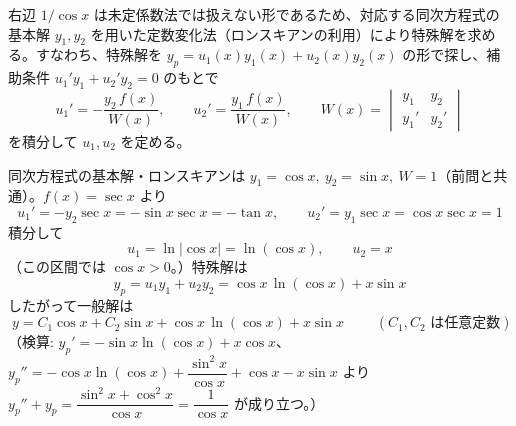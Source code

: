 
右辺 $1/\cos x$ は未定係数法では扱えない形であるため、対応する同次方程式の基本解 $y_{1}, y_{2}$ を用いた定数変化法（ロンスキアンの利用）により特殊解を求める。すなわち、特殊解を $y_{p} = u_{1}(x)y_{1}(x) + u_{2}(x)y_{2}(x)$ の形で探し、補助条件 $u_{1}'y_{1} + u_{2}'y_{2} = 0$ のもとで
\[
u_{1}' = -\frac{y_{2}\,f(x)}{W(x)}, \qquad u_{2}' = \frac{y_{1}\,f(x)}{W(x)}, \qquad W(x) = \begin{vmatrix} y_{1} & y_{2} \\ y_{1}' & y_{2}' \end{vmatrix}
\]
を積分して $u_{1}, u_{2}$ を定める。

同次方程式の基本解・ロンスキアンは $y_{1}=\cos x,\ y_{2}=\sin x,\ W=1$（前問と共通）。$f(x)=\sec x$ より
\[
u_{1}' = -y_{2}\sec x = -\sin x\sec x = -\tan x,
\qquad
u_{2}' = y_{1}\sec x = \cos x\sec x = 1
\]
積分して
\[
u_{1} = \ln|\cos x| = \ln(\cos x), \qquad u_{2} = x
\]
（この区間では $\cos x>0$。）特殊解は
\[
y_{p} = u_{1}y_{1}+u_{2}y_{2} = \cos x\,\ln(\cos x) + x\sin x
\]
したがって一般解は
\[
\boxed{\; y = C_{1}\cos x + C_{2}\sin x + \cos x\,\ln(\cos x) + x\sin x \;}
\qquad (C_{1}, C_{2}\text{ は任意定数})
\]
（検算: $y_{p}'=-\sin x\ln(\cos x)+x\cos x$、$y_{p}''=-\cos x\ln(\cos x)+\dfrac{\sin^{2}x}{\cos x}+\cos x-x\sin x$ より
$y_{p}''+y_{p}=\dfrac{\sin^{2}x+\cos^{2}x}{\cos x}=\dfrac{1}{\cos x}$ が成り立つ。）
